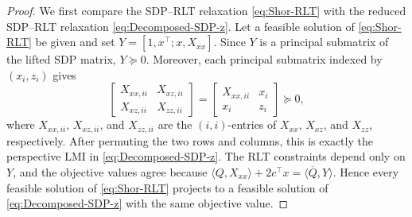 \documentclass[11pt]{article}
\def\bQ{\overline{Q}}
\theoremstyle{plain}
\begin{document}
\begin{proof}\;
We first compare the SDP--RLT relaxation \eqref{eq:Shor-RLT} with the reduced SDP--RLT relaxation \eqref{eq:Decomposed-SDP-z}. Let a feasible solution of \eqref{eq:Shor-RLT} be given and set $Y=[1, x^\top; x, X_{xx}]$.
Since $Y$ is a principal submatrix of the lifted SDP matrix, $Y\succeq0$. Moreover, each principal submatrix indexed by $(x_i,z_i)$ gives
\[
\begin{bmatrix}
X_{xx,ii}&X_{xz,ii}\\
X_{xz,ii}&X_{zz,ii}
\end{bmatrix}
=
\begin{bmatrix}
X_{xx,ii}&x_i\\
x_i&z_i
\end{bmatrix}
\succeq0,
\]
where $X_{xx,ii}$, $X_{xz,ii}$, and $X_{zz,ii}$ are the $(i,i)$-entries of $X_{xx}$, $X_{xz}$, and $X_{zz}$, respectively.
After permuting the two rows and columns, this is exactly the perspective LMI in \eqref{eq:Decomposed-SDP-z}. The RLT constraints depend only on $Y$, and the objective values agree because $\langle Q,X_{xx}\rangle+2c^\top x=\langle \bQ,Y\rangle$.
Hence every feasible solution of \eqref{eq:Shor-RLT} projects to a feasible solution of \eqref{eq:Decomposed-SDP-z} with the same objective value.


\end{proof}
\end{document}

